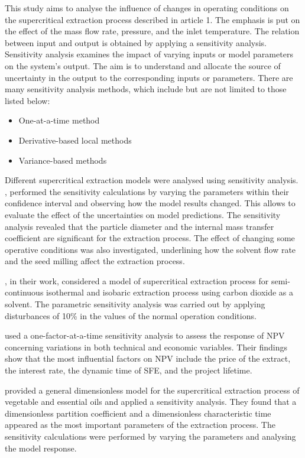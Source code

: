 \documentclass[../Article_Sensitivity_Analsysis.tex]{subfiles}
\begin{document}
	
	This study aims to analyse the influence of changes in operating conditions on the supercritical extraction process described in {\color{red}article 1}. The emphasis is put on the effect of the mass flow rate, pressure, and the inlet temperature. The relation between input and output is obtained by applying a sensitivity analysis. Sensitivity analysis examines the impact of varying inputs or model parameters on the system's output. The aim is to understand and allocate the source of uncertainty in the output to the corresponding inputs or parameters. There are many sensitivity analysis methods, which include but are not limited to those listed below:
	
	\begin{itemize}
		\item One-at-a-time method
		\item Derivative-based local methods
		\item Variance-based methods
	\end{itemize}
	
	Different supercritical extraction models were analysed using sensitivity analysis. \citet{Fiori_2007}, performed the sensitivity calculations by varying the parameters within their confidence interval and observing how the model results changed. This allows to evaluate the effect of the uncertainties on model predictions. The sensitivity analysis revealed that the particle diameter and the internal mass transfer coefficient are significant for the extraction process. The effect of changing some operative conditions was also investigated, underlining how the solvent flow rate and the seed milling affect the extraction process.
	
	\citet{Santos2000}, in their work, considered a model of supercritical extraction process for semi-continuous isothermal and isobaric extraction process using carbon dioxide as a solvent. The parametric sensitivity analysis was carried out by applying disturbances of 10\% in the values of the normal operation conditions.
	
	\citet{Hatami2024} used a one-factor-at-a-time sensitivity analysis to assess the response of NPV concerning variations in both technical and economic variables. Their findings show that the most influential factors on NPV include the price of the extract, the interest rate, the dynamic time of SFE, and the project lifetime.
	
	\citet{Poletto1996} provided a general dimensionless model for the supercritical extraction process of vegetable and essential oils and applied a sensitivity analysis. They found that a dimensionless partition coefficient and a dimensionless characteristic time appeared as the most important parameters of the extraction process. The sensitivity calculations were performed by varying the parameters and analysing the model response.
	
\end{document}
